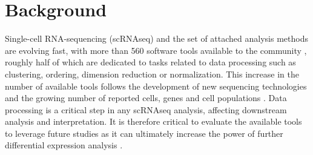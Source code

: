 \documentclass{bmcart}
\begin{document}


\section*{Background}

Single-cell RNA-sequencing (scRNAseq) and the set of attached analysis methods are evolving fast, with more than 560 software tools available to the community \cite{ZappiaDB2018}, roughly half of which are dedicated to tasks related to data processing such as clustering, ordering, dimension reduction or normalization. This increase in the number of available tools follows the development of new sequencing technologies and the growing number of reported cells, genes and cell populations \cite{SvenssonDB2019}. Data processing is a critical step in any scRNAseq analysis, affecting downstream analysis and interpretation. It is therefore critical to evaluate the available tools to leverage future studies as it can ultimately increase the power of further differential expression analysis \cite{viethSystematic2019}.
\end{document}
